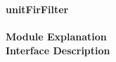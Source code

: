 \documentclass[../../../../doc/ASP-SoC_doc/main.tex]{subfiles}
\begin{document}
\textbf{unitFirFilter}
\\\\
\textbf{Module Explanation}
\\
\textbf{Interface Description}
\\
\end{document}

